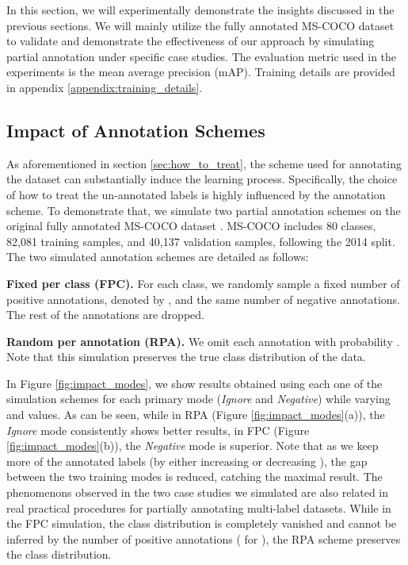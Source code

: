 \label{experiments}
In this section, we will experimentally demonstrate the insights discussed in the previous sections. We will mainly utilize the fully annotated MS-COCO dataset \cite{lin2014microsoft} to validate and demonstrate the effectiveness of our approach by simulating partial annotation under specific case studies. The evaluation metric used in the experiments is the mean average precision (mAP). Training details are provided in appendix \ref{appendix:training_details}.


\subsection{Impact of Annotation Schemes}
\label{sec:annotation_schemes}
As aforementioned in section \ref{sec:how_to_treat}, the scheme used for annotating the dataset can substantially induce the learning process. Specifically, the choice of how to treat the un-annotated labels is highly influenced by the annotation scheme. To demonstrate that, we simulate two partial annotation schemes on the original fully annotated MS-COCO dataset \cite{lin2014microsoft}. 
MS-COCO includes 80 classes, 82,081 training samples, and 40,137 validation samples, following the 2014 split. The two simulated annotation schemes are detailed as follows:



\noindent\textbf{Fixed per class (FPC).} 
For each class, we randomly sample a fixed number of positive annotations, denoted by , and the same number of negative annotations. The rest of the annotations are dropped. 


\noindent\textbf{Random per annotation (RPA).}
We omit each annotation with probability . Note that this simulation preserves the true class distribution of the data. 

In Figure \ref{fig:impact_modes}, we show results obtained using each one of the simulation schemes for each primary mode (\textit{Ignore} and \textit{Negative}) while varying  and  values. As can be seen, while in RPA (Figure \ref{fig:impact_modes}(a)), the \textit{Ignore} mode consistently shows better results, in FPC (Figure \ref{fig:impact_modes}(b)), the \textit{Negative} mode is superior. 
Note that as we keep more of the annotated labels (by either increasing  or decreasing ), the gap between the two training modes is reduced, catching the maximal result.
The phenomenons observed in the two case studies we simulated are also related in real practical procedures for partially annotating multi-label datasets. While in the FPC simulation, the class distribution is completely vanished and cannot be inferred by the number of positive annotations ( for  ), the RPA scheme preserves the class distribution. 


